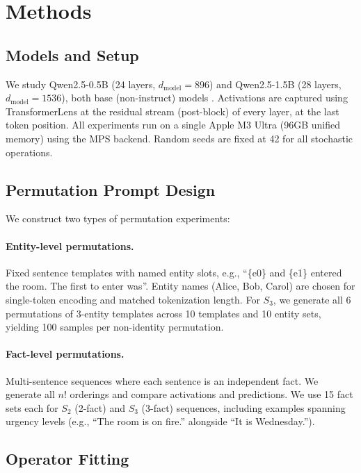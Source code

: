 \documentclass[10pt, letterpaper]{article}
\begin{document}
\section{Methods}
\label{sec:methods}

\subsection{Models and Setup}

We study Qwen2.5-0.5B (24 layers, $d_\text{model} = 896$) and Qwen2.5-1.5B (28 layers, $d_\text{model} = 1536$), both base (non-instruct) models \cite{qwen2025}. Activations are captured using TransformerLens \cite{nanda2022transformerlens} at the residual stream (post-block) of every layer, at the last token position. All experiments run on a single Apple M3 Ultra (96GB unified memory) using the MPS backend. Random seeds are fixed at 42 for all stochastic operations.

\subsection{Permutation Prompt Design}

We construct two types of permutation experiments:

\paragraph{Entity-level permutations.} Fixed sentence templates with named entity slots, e.g., ``\{e0\} and \{e1\} entered the room. The first to enter was''. Entity names (Alice, Bob, Carol) are chosen for single-token encoding and matched tokenization length. For $S_3$, we generate all 6 permutations of 3-entity templates across 10 templates and 10 entity sets, yielding 100 samples per non-identity permutation.

\paragraph{Fact-level permutations.} Multi-sentence sequences where each sentence is an independent fact. We generate all $n!$ orderings and compare activations and predictions. We use 15 fact sets each for $S_2$ (2-fact) and $S_3$ (3-fact) sequences, including examples spanning urgency levels (e.g., ``The room is on fire.'' alongside ``It is Wednesday.'').

\subsection{Operator Fitting}
\end{document}
